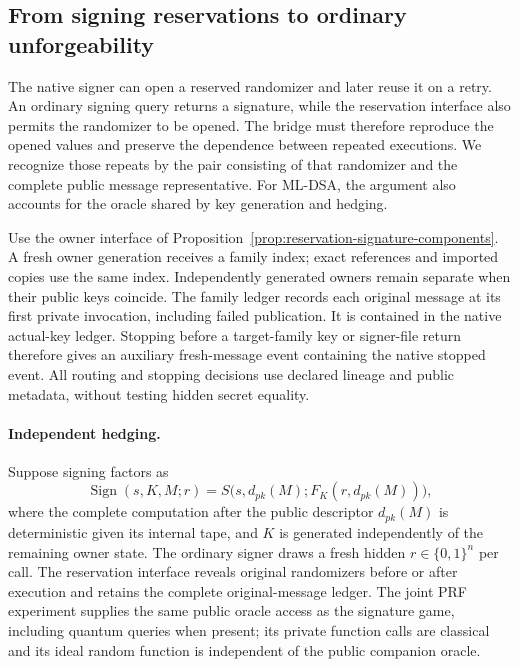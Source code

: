 \subsection{From signing reservations to ordinary unforgeability}
\label{sec:reservation-ordinary-bridge}

The native signer can open a reserved randomizer and later reuse it on
a retry. An ordinary signing query returns a signature, while the
reservation interface also permits the randomizer to be opened. The
bridge must therefore reproduce the opened values and preserve the
dependence between repeated executions. We recognize those repeats by
the pair consisting of that randomizer and the complete public
message representative. For ML-DSA, the argument also accounts for the
oracle shared by key generation and hedging.

Use the owner interface of
Proposition~\ref{prop:reservation-signature-components}. A fresh owner
generation receives a family index; exact references and imported copies
use the same index. Independently generated owners remain separate when
their public keys coincide. The family ledger records each original
message at its first private invocation, including failed publication.
It is contained in the native actual-key ledger. Stopping before a
target-family key or signer-file return therefore gives an auxiliary
fresh-message event containing the native stopped event. All routing and
stopping decisions use declared lineage and public metadata, without
testing hidden secret equality.

\paragraph{Independent hedging.}
Suppose signing factors as
\[
 \operatorname{Sign}(s,K,M;r)
 =S\bigl(s,d_{pk}(M);F_K(r,d_{pk}(M))\bigr),
\]
where the complete computation after the public descriptor $d_{pk}(M)$
is deterministic given its internal tape, and $K$ is generated
independently of the remaining owner state. The ordinary signer draws a
fresh hidden $r\in\{0,1\}^n$ per call. The reservation interface reveals
original randomizers before or after execution and retains the complete
original-message ledger. The joint PRF experiment supplies the same public
oracle access as the signature game, including quantum queries when
present; its private function calls are classical and its ideal random
function is independent of the public companion oracle.

